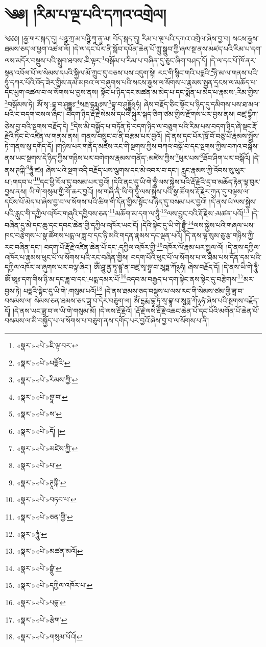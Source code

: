 \chapter{༄༅། །རིམ་པ་ལྔ་པའི་དཀའ་འགྲེལ།}༄༅༅། །རྒྱ་གར་སྐད་དུ། པཉྩ་ཀྲ་མ་པཉྩི་ཀཱ་ནཱ་མ། བོད་སྐད་དུ། རིམ་པ་ལྔ་པའི་དཀའ་འགྲེལ་ཞེས་བྱ་བ། སངས་རྒྱས་ཐམས་ཅད་ལ་ཕྱག་འཚལ་ལོ། །དེ་ལ་དང་པོར་ནི་སློབ་དཔོན་ཆེན་པོ་ཀླུ་སྒྲུབ་ཀྱི་ཞལ་སྔ་ནས་མཛད་པའི་རིམ་པ་དག་ལས་མདོར་བསྡུས་པའི་སྒྲུབ་ཐབས་:ཇི་ལྟར་\footnote{«སྣར་»«པེ་»ཇི་ལྟ་བར་}བསྒོམ་པ་རིམ་པ་བཞིན་དུ་ཅུང་ཞིག་བཤད་དོ། །དེ་ལ་དང་པོ་ཁོ་ནར་སྟན་འབོལ་པོ་ལ་སེམས་དཔའི་སྐྱིལ་མོ་ཀྲུང་དུ་བཅས་པས་འདུག་སྟེ། རང་གི་སྙིང་གའི་པདྨའི་\footnote{«སྣར་»«པེ་»པདྨོའི་}ཉི་མ་ལ་གནས་པའི་ཧཱུཾ་དཀར་པོའི་འོད་ཟེར་གྱིས་ནམ་མཁའ་ལ་བཞུགས་པའི་སངས་རྒྱས་ལ་སོགས་པ་རྣམས་སྤྱན་དྲངས་ལ་མཆོད་པ་དང་ཕྱག་འཚལ་བ་ལ་སོགས་པ་བྱས་ནས། སྟོང་པ་ཉིད་དང་མཚན་མ་མེད་པ་དང་སྨོན་པ་མེད་པ་རྣམས་:རིམ་གྱིས་\footnote{«སྣར་»«པེ་»རིམས་ཀྱི་}བསྒོམས་ཏེ། ཨོཾ་སྭ་:བྷཱ་བ་ཤུདྡྷཿ་\footnote{«སྣར་»«པེ་»བྷཱ་བ་}སརྦ་དྷརྨཱཿས་\footnote{«སྣར་»«པེ་»ས་}བྷཱ་བ་ཤུདྡྷོ྅ཧཾ། ཞེས་བརྗོད་ཅིང་སྟོང་པ་ཉིད་དུ་དམིགས་པས་ཐ་མལ་པའི་ང་བདག་བསལ་ཞིང་། བདག་ཉིད་རྡོ་རྗེ་སེམས་དཔའི་སྐུར་སྐད་ཅིག་ཙམ་གྱིས་རྫོགས་པར་བྱས་ནས། བཛྲ་དྷྲྀཀ་ཅེས་བྱ་བའི་སྔགས་བརྗོད་དེ། \footnote{«སྣར་»«པེ་»དོ། ། }དེས་མི་བསྐྱོད་པ་བཏོན་ཏེ་བདག་ཉིད་ལ་བཅུག་པའི་རིམ་པས་བདག་ཉིད་ཞེ་སྡང་རྡོ་རྗེའི་ཏིང་ངེ་འཛིན་ལ་གནས་ནས། གནས་བསྲུང་བ་ནི་བརྩམ་པར་བྱའོ། །དེ་ནས་དང་པོར་ཁྲོ་བོ་བཅུ་པོ་རྣམས་སྤྲོས་ཏེ་གནས་སུ་དགོད་དོ། །གཉིས་པར་གནོད་མཛེས་རང་གི་སྔགས་ཀྱིས་བཀའ་བསྒོ་བ་དང་སྔགས་ཀྱིས་བཀའ་བསྒོས་ནས་ཡང་སྔགས་དེ་ཉིད་ཀྱིས་གཉིས་པར་བགེགས་རྣམས་གནོད་:མཛེས་ཀྱིས་\footnote{«སྣར་»«པེ་»མཛེས་ཀྱི་}ཕུར་པས་\footnote{«སྣར་»«པེ་»པ་}ཐོབ་ཤིག་པར་བསྒོའོ། །དེ་ནས་ཊཀྐི་\footnote{«སྣར་»«པེ་»ཊཱཀྐི་}ཧཱུྃ་ཛཿ། ཞེས་པའི་སྔག་འདི་བརྗོད་པས་ལྕགས་དང་མེ་འབར་བ་དང་། རླུང་རྣམས་ཀྱི་འོབས་སུ་ཕུར་པ་:གདབ་པ་\footnote{«སྣར་»«པེ་»བཏབ་པ་}དང་ཕྱི་རོལ་དུ་བསམ་པར་བྱའོ། །དེའི་ནང་དུ་ཡི་གེ་ཧཱུྃ་ལས་སྐྱེས་པའི་རྡོ་རྗེའི་དྲ་བ་མཆོད་རྟེན་ལྟ་བུར་བྱས་ནས། ཡི་གེ་གསུམ་གྱི་གོ་ཆར་བྱའོ། །ས་གཞི་ནི་ཡི་གེ་ཧཱུྃ་ལས་སྐྱེས་པའི་སྣ་ཚོགས་རྡོ་རྗེར་ཀུན་དུ་བལྟས་ལ་དངོས་པོ་མེད་པ་ཞེས་བྱ་བ་ལ་སོགས་པའི་ཚིག་གི་དོན་གྱིས་སྟོང་པ་ཉིད་དུ་བསམ་པར་བྱའོ། །དེ་ནས་ཡཾ་ལས་སྐྱེས་པའི་རླུང་གི་དཀྱིལ་འཁོར་གཞུའི་དབྱིབས་ཅན་\footnote{«སྣར་»«པེ་»ཅན་གྱི་}མཆོག་མ་དག་ལ་ཧཱུྃ་\footnote{«སྣར་»ཧཱུཾ་}ལས་བྱུང་བའི་རྡོ་རྗེས་:མཚན་པའོ།\footnote{«སྣར་»«པེ་»མཚན་མའོ།} །དེ་བཞིན་དུ་མེ་དང་ཆུ་དང་དབང་ཆེན་གྱི་དཀྱིལ་འཁོར་ཡང་ངོ། །དེའི་སྟེང་དུ་ཡི་གེ་བྷྲཱུྃ་\footnote{«སྣར་»«པེ་»བྷྲུཾ་}ལས་སྐྱེས་པའི་གཞལ་ཡས་ཁང་བརྩེགས་པ་སྣ་ཚོགས་པདྨ་ལ་ཟླ་བ་དང་ཉི་མའི་གདན་རྣམས་དང་ལྡན་པའོ། །དེ་ནས་ལྷ་སུམ་ཅུ་རྩ་གཉིས་ཀྱི་རང་བཞིན་དང་། བདག་པོ་རྡོ་རྗེ་འཛིན་ཆེན་པོ་དང་:དཀྱིལ་འཁོར་གྱི་\footnote{«སྣར་»«པེ་»དཀྱིལ་འཁོར་པ་}འཁོར་ལོ་རྣམ་པར་སྤྲུལ་ལོ། །དེ་ནས་དཀྱིལ་འཁོར་པ་རྣམས་ཕུང་པོ་ལ་སོགས་པའི་རང་བཞིན་གྱིས། བདག་པོའི་ཕུང་པོ་ལ་སོགས་པ་ལ་ཐིམ་པས་དོན་དམ་པའི་དཀྱིལ་འཁོར་ལ་ཞུགས་པར་བལྟ་ཞིང་། ཨོཾ་ཤཱུ་ནྱ་ཏཱ་ཛྙཱ་ན་བཛྲ་སྭ་བྷཱ་བ་ཨཱཏྨ་ཀོ྅ཧཾ། ཞེས་བརྗོད་དོ། །དེ་ནས་ཡི་གེ་ཧཱུྃ་ཨོཾ་ཨཱཿ་དག་གིས་ཉི་མ་དང་ཟླ་བ་དང་:པདྨ་དམར་པོ་\footnote{«སྣར་»«པེ་»པདྨ་}འདབ་མ་བརྒྱད་པ་དག་སྟེང་ནས་སྟེང་དུ་བརྩེགས་\footnote{«སྣར་»«པེ་»རྩེག་}མར་བྱས་ཏེ། པདྨའི་སྟེང་དུ་ཡི་གེ་:གསུམ་པའོ།\footnote{«སྣར་»«པེ་»གསུམ་པོའོ།} །དེ་ནས་ཐམས་ཅད་བསྡུས་པ་ལས་རང་གི་སེམས་ཙམ་གྱི་ཟླ་བ་བསམས་ལ། སེམས་ཅན་ཐམས་ཅད་ཟླ་བ་དེར་བཅུག་ལ། ཨོཾ་དྷརྨ་དྷཱ་ཏུ་སྭ་བྷཱ་བ་ཨཱཏྨ་ཀོ྅ཧཾ་ཞེས་པའི་སྔགས་བརྗོད་དོ། །དེ་ནས་ཡང་ཟླ་བ་ལ་ཡི་གེ་གསུམ་མོ། །དེ་ལས་རྡོ་རྗེའོ། །རྡོ་རྗེ་ལས་རྡོ་རྗེ་འཆང་ཆེན་པོ་དང་པོའི་མགོན་པོ་ཆེན་པོ་བསམས་ལ་མི་བསྐྱོད་པ་ལ་སོགས་པ་བཅུག་ནས་དགོད་པར་བྱའོ་ཞེས་བྱ་བ་ལ་སོགས་པ་ནི། 
